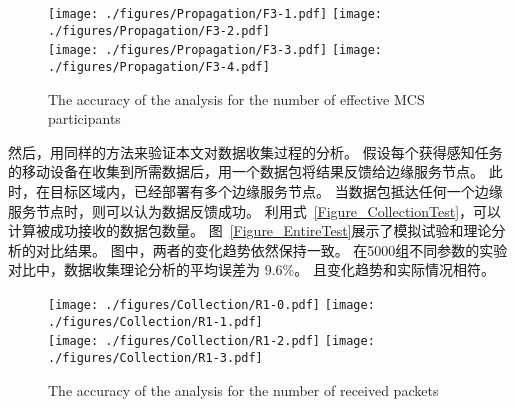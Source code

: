 \begin{figure}[!h]
  \centering
  {\texttt{[image: ./figures/Propagation/F3-1.pdf]}}
  {\texttt{[image: ./figures/Propagation/F3-2.pdf]}}\\
  {\texttt{[image: ./figures/Propagation/F3-3.pdf]}}
  {\texttt{[image: ./figures/Propagation/F3-4.pdf]}}
  \vspace{-1em}
  \caption{The accuracy of the analysis for the number of effective MCS participants}
  \label{Figure_PropagationTest}
\end{figure}


然后，用同样的方法来验证本文对数据收集过程的分析。
假设每个获得感知任务的移动设备在收集到所需数据后，用一个数据包将结果反馈给边缘服务节点。
此时，在目标区域内，已经部署有多个边缘服务节点。
当数据包抵达任何一个边缘服务节点时，则可以认为数据反馈成功。
利用式~\eqref{Figure_CollectionTest}，可以计算被成功接收的数据包数量。
图~\ref{Figure_EntireTest}展示了模拟试验和理论分析的对比结果。
图中，两者的变化趋势依然保持一致。
在5000组不同参数的实验对比中，数据收集理论分析的平均误差为 9.6\%。
且变化趋势和实际情况相符。

\begin{figure}[!h]
  \centering
  {\texttt{[image: ./figures/Collection/R1-0.pdf]}}
  {\texttt{[image: ./figures/Collection/R1-1.pdf]}}\\
  {\texttt{[image: ./figures/Collection/R1-2.pdf]}}
  {\texttt{[image: ./figures/Collection/R1-3.pdf]}}
  \vspace{-1em}
  \caption{The accuracy of the analysis for the number of received packets}
  \label{Figure_CollectionTest}
  \end{figure}

